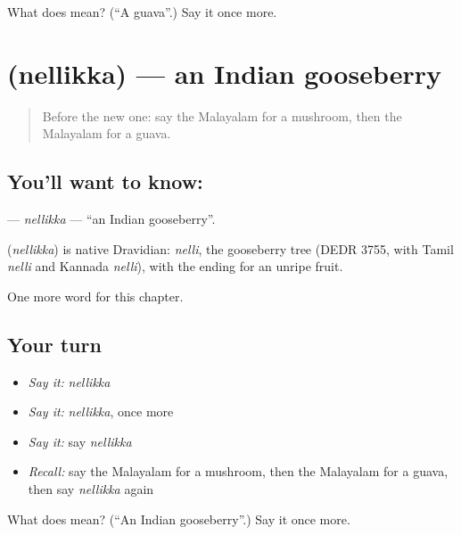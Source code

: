 \begin{tcolorbox}[breakable,colback=teal!4,colframe=teal!35!black,title={Before you move on}]
What does  mean? (\textquotedblleft{}A guava\textquotedblright{}.) Say it once more.
\end{tcolorbox}
\section[\texorpdfstring{\ml{നെല്ലിക്ക} (nellikka)}{നെല്ലിക്ക (nellikka)}]{ (nellikka) — an Indian gooseberry}

\label{lesson:ML-C297-nellikka}



\begin{quote}
Before the new one: say the Malayalam for a mushroom, then the Malayalam for a guava.
\end{quote}

\subsection*{You'll want to know: }
\textbf{} — \emph{nellikka} — \textquotedblleft{}an Indian gooseberry\textquotedblright{}.

\begin{cousinweb}
\textbf{} (\emph{nellikka}) is native Dravidian: \emph{nelli}, the gooseberry tree (DEDR 3755, with Tamil \emph{nelli} and Kannada \emph{nelli}), with the ending for an unripe fruit.
\end{cousinweb}

\begin{grammarlens}[title={What you've built}]
One more word for this chapter.
\end{grammarlens}

\subsection*{Your turn}
\begin{itemize}
\raggedright
  \item \emph{Say it:} \emph{nellikka}
  \item \emph{Say it:} \emph{nellikka}, once more
  \item \emph{Say it:} say \emph{nellikka}
  \item \emph{Recall:} say the Malayalam for a mushroom, then the Malayalam for a guava, then say \emph{nellikka} again
\end{itemize}

\begin{tcolorbox}[breakable,colback=teal!4,colframe=teal!35!black,title={Before you move on}]
What does  mean? (\textquotedblleft{}An Indian gooseberry\textquotedblright{}.) Say it once more.
\end{tcolorbox}
